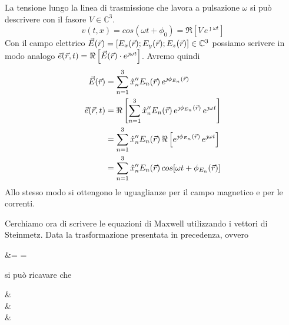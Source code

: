 La tensione lungo la linea di trasmissione che lavora a pulsazione $\omega$ si può descrivere con il fasore $V \in \mathbb{C}^3$.
\begin{equation}
  v(t,x) = cos(\omega t + \phi_0) = \Re\left[V \, e^{\jmath \omega t}\right]
\end{equation}
Con il campo elettrico $\vec{E}(\vec{r}) = \left[E_x(\vec{r});E_y(\vec{r});E_z(\vec{r})\right] \in \mathbb{C}^3$ possiamo scrivere in modo analogo $\vec{e}(\vec{r},t) = \Re\left[\vec{E}(\vec{r})\cdot e^{\jmath \omega t}\right]$. Avremo quindi
\begin{equation}\begin{split}
  \vec{E}(\vec{r}) &= \sum\limits_{n=1}^3 \hat{x}_n^{\prime\prime} E_n(\vec{r})\, e^{\jmath \phi_{E_n}(\vec{r})} \\
  \vec{e}(\vec{r},t) &= \Re\left[\sum\limits_{n=1}^3 \hat{x}_n^{\prime\prime} E_n(\vec{r})\, e^{\jmath \phi_{E_n}(\vec{r})}\, e^{\jmath \omega t}\right]\\
  &=\sum\limits_{n=1}^3 \hat{x}_n^{\prime\prime} E_n(\vec{r})\, \Re\left[e^{\jmath \phi_{E_n}(\vec{r})}\, e^{\jmath \omega t}\right]\\
  &=\sum\limits_{n=1}^3 \hat{x}_n^{\prime\prime} E_n(\vec{r})\, cos[\omega t + \phi_{E_n}(\vec{r})]
\end{split}\end{equation}
Allo stesso modo si ottengono le uguaglianze per il campo magnetico e per le correnti.

Cerchiamo ora di scrivere le equazioni di Maxwell utilizzando i vettori di Steinmetz. Data la trasformazione presentata in precedenza, ovvero
\begin{esp}
  \rot \e &= \rot \Re{} = \Re{}\\
\end{esp}

si può ricavare che
\begin{esp}
	\rot\e &\leftrightarrow \rot\E \\
	\diverg\e &\leftrightarrow \diverg\E \\
	 & \leftrightarrow \jmath \omega \E\quad {} \\
\end{esp}

